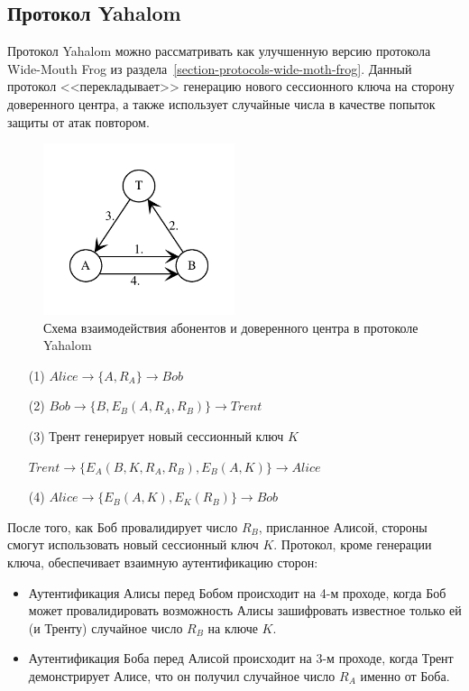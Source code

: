 \subsection{Протокол Yahalom}\label{section-protocols-yahalom}

Протокол Yahalom можно рассматривать как улучшенную версию протокола Wide-Mouth Frog из раздела~\ref{section-protocols-wide-moth-frog}. Данный протокол <<перекладывает>> генерацию нового сессионного ключа на сторону доверенного центра, а также использует случайные числа в качестве попыток защиты от атак повтором.

\begin{figure}[!htb]
    \centering
    \includegraphics[width=0.5\textwidth]{pic/key_distribution-yahalom}
    \caption{Схема взаимодействия абонентов и доверенного центра в протоколе Yahalom\label{fig:key_distribution-yahalom}}
\end{figure}

\begin{itemize}
	\item[(1)] $Alice \to \{ A, R_A \} \to Bob$
	\item[(2)] $Bob \to \{ B, E_B( A, R_A, R_B ) \} \to Trent$
	\item[(3)] Трент генерирует новый сессионный ключ $K$
	\item[{}] $Trent \to \{ E_A( B, K, R_A, R_B ), E_B(A, K) \} \to Alice$
	\item[(4)] $Alice \to \{ E_B( A, K ), E_K( R_B ) \} \to Bob$
\end{itemize}

После того, как Боб провалидирует число $R_B$, присланное Алисой, стороны смогут использовать новый сессионный ключ $K$. Протокол, кроме генерации ключа, обеспечивает взаимную аутентификацию сторон:

\begin{itemize}
    \item Аутентификация Алисы перед Бобом происходит на 4-м проходе, когда Боб может провалидировать возможность Алисы зашифровать известное только ей (и Тренту) случайное число $R_B$ на ключе $K$.
    \item Аутентификация Боба перед Алисой происходит на 3-м проходе, когда Трент демонстрирует Алисе, что он получил случайное число $R_A$ именно от Боба.
\end{itemize}

